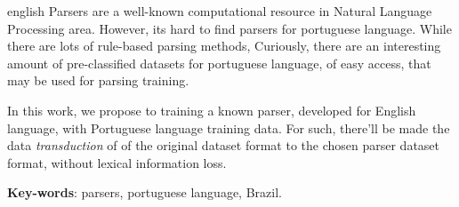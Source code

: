 \setlength{\absparsep}{18pt} %

\begin{resumo}[Abstract]
 \begin{otherlanguage*}{english}
    Parsers are a well-known computational resource in Natural Language Processing area. However, its hard to find parsers for portuguese language. 
    While there are lots of rule-based
  parsing    
   methods,  Curiously, there are an interesting amount of pre-classified datasets for portuguese language, of easy access, that may be used for parsing training.
    
    In this work, we propose to training a known parser, developed for English language, with Portuguese language training data. For such, there'll be made the data \textit{transduction} of 
    of the original dataset format to the chosen parser dataset format, without lexical information loss.

   \vspace{\onelineskip}
 
   \noindent 
   \textbf{Key-words}: parsers, portuguese language, Brazil.
 \end{otherlanguage*}
\end{resumo}